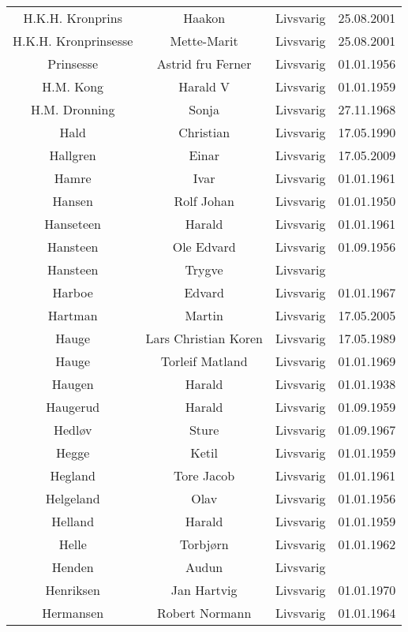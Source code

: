 \begin{tabular}{cccc}
        H.K.H. Kronprins	&	Haakon 	&	Livsvarig	&	25.08.2001	\\
        H.K.H. Kronprinsesse	&	Mette-Marit 	&	Livsvarig	&	25.08.2001	\\
        Prinsesse	&	Astrid fru Ferner	&	Livsvarig 	&	01.01.1956	\\
        H.M. Kong	&	Harald V	&	Livsvarig 	&	01.01.1959	\\
        H.M. Dronning	&	Sonja	&	Livsvarig 	&	27.11.1968	\\
        Hald	&	Christian	&	Livsvarig 	&	17.05.1990	\\
        Hallgren	&	Einar	&	Livsvarig	&	17.05.2009	\\
        Hamre	&	Ivar	&	Livsvarig 	&	01.01.1961	\\
        Hansen	&	Rolf Johan	&	Livsvarig 	&	01.01.1950	\\
        Hanseteen	&	Harald	&	Livsvarig 	&	01.01.1961	\\
        Hansteen	&	Ole Edvard	&	Livsvarig 	&	01.09.1956	\\
        Hansteen	&	Trygve	&	Livsvarig 	&		\\
        Harboe	&	Edvard	&	Livsvarig 	&	01.01.1967	\\
        Hartman 	&	Martin	&	Livsvarig	&	17.05.2005	\\
        Hauge	&	Lars Christian Koren	&	Livsvarig 	&	17.05.1989	\\
        Hauge	&	Torleif Matland	&	Livsvarig 	&	01.01.1969	\\
        Haugen	&	Harald	&	Livsvarig 	&	01.01.1938	\\
        Haugerud	&	Harald	&	Livsvarig 	&	01.09.1959	\\
        Hedløv	&	Sture	&	Livsvarig 	&	01.09.1967	\\
        Hegge	&	Ketil	&	Livsvarig 	&	01.01.1959	\\
        Hegland	&	Tore Jacob	&	Livsvarig 	&	01.01.1961	\\
        Helgeland	&	Olav	&	Livsvarig 	&	01.01.1956	\\
        Helland	&	Harald	&	Livsvarig 	&	01.01.1959	\\
        Helle	&	Torbjørn	&	Livsvarig 	&	01.01.1962	\\
        Henden	&	Audun	&	Livsvarig 	&		\\
        Henriksen	&	Jan Hartvig	&	Livsvarig 	&	01.01.1970	\\
        Hermansen	&	Robert Normann	&	Livsvarig 	&	01.01.1964	\\

\end{tabular}
